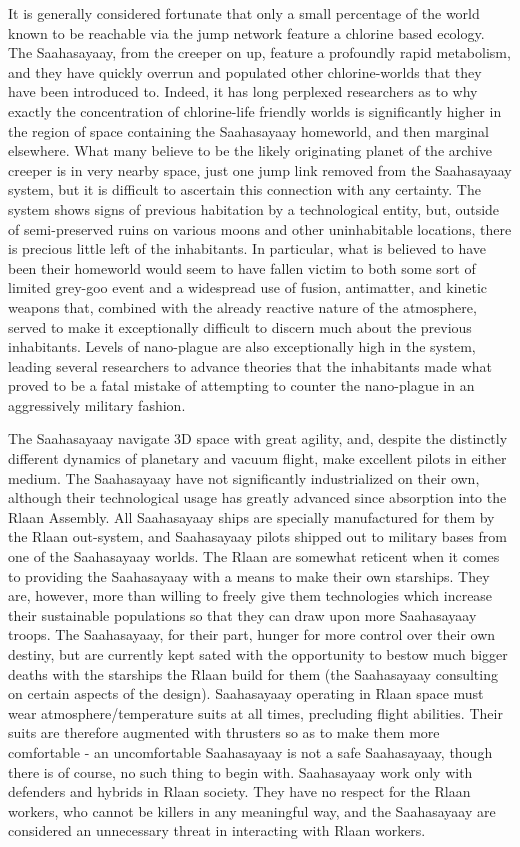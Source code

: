 It is generally considered fortunate that only a small percentage of
the world known to be reachable via the jump network feature a
chlorine based ecology. The Saahasayaay, from the creeper on up,
feature a profoundly rapid metabolism, and they have quickly overrun
and populated other chlorine-worlds that they have been introduced
to. Indeed, it has long perplexed researchers as to why exactly the
concentration of chlorine-life friendly worlds is significantly higher
in the region of space containing the Saahasayaay homeworld, and then
marginal elsewhere. What many believe to be the likely originating
planet of the archive creeper is in very nearby space, just one jump
link removed from the Saahasayaay system, but it is difficult to
ascertain this connection with any certainty. The system shows signs
of previous habitation by a technological entity, but, outside of
semi-preserved ruins on various moons and other uninhabitable
locations, there is precious little left of the inhabitants. In
particular, what is believed to have been their homeworld would seem
to have fallen victim to both some sort of limited grey-goo event and
a widespread use of fusion, antimatter, and kinetic weapons that,
combined with the already reactive nature of the atmosphere, served to
make it exceptionally difficult to discern much about the previous
inhabitants. Levels of nano-plague are also exceptionally high in the
system, leading several researchers to advance theories that the
inhabitants made what proved to be a fatal mistake of attempting to
counter the nano-plague in an aggressively military fashion.

The Saahasayaay navigate 3D space with great agility, and, despite the
distinctly different dynamics of planetary and vacuum flight, make
excellent pilots in either medium. The Saahasayaay have not
significantly industrialized on their own, although their
technological usage has greatly advanced since absorption into the
Rlaan Assembly. All Saahasayaay ships are specially manufactured for
them by the Rlaan out-system, and Saahasayaay pilots shipped out to
military bases from one of the Saahasayaay worlds. The Rlaan are
somewhat reticent when it comes to providing the Saahasayaay with a
means to make their own starships. They are, however, more than
willing to freely give them technologies which increase their
sustainable populations so that they can draw upon more Saahasayaay
troops. The Saahasayaay, for their part, hunger for more control over
their own destiny, but are currently kept sated with the opportunity
to bestow much bigger deaths with the starships the Rlaan build for
them (the Saahasayaay consulting on certain aspects of the
design). Saahasayaay operating in Rlaan space must wear
atmosphere/temperature suits at all times, precluding flight
abilities. Their suits are therefore augmented with thrusters so as to
make them more comfortable - an uncomfortable Saahasayaay is not a
safe Saahasayaay, though there is of course, no such thing to begin
with. Saahasayaay work only with defenders and hybrids in Rlaan
society. They have no respect for the Rlaan workers, who cannot be
killers in any meaningful way, and the Saahasayaay are considered an
unnecessary threat in interacting with Rlaan workers.


